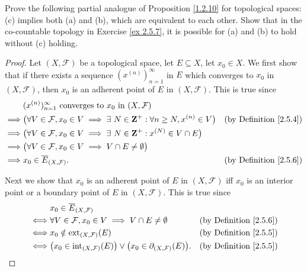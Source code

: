 \begin{exercise}\label{ex 2.5.10}
    Prove the following partial analogue of Proposition \ref{1.2.10} for topological spaces:
    (c) implies both (a) and (b), which are equivalent to each other.
    Show that in the co-countable topology in Exercise \ref{ex 2.5.7}, it is possible for (a) and (b) to hold without (c) holding.
\end{exercise}

\begin{proof}
    Let \((X, \mathcal{F})\) be a topological space, let \(E \subseteq X\), let \(x_0 \in X\).
    We first show that if there exists a sequence \((x^{(n)})_{n = 1}^\infty\) in \(E\) which converges to \(x_0\) in \((X, \mathcal{F})\), then \(x_0\) is an adherent point of \(E\) in \((X, \mathcal{F})\).
    This is true since
    \begin{align*}
                 & (x^{(n)})_{n = 1}^\infty \text{ converges to } x_0 \text{ in } (X, \mathcal{F})                                                                            \\
        \implies & \big(\forall V \in \mathcal{F}, x_0 \in V \implies \exists\ N \in \mathbf{Z}^+ : \forall n \geq N, x^{(n)} \in V\big) & \text{(by Definition \ref{2.5.4})} \\
        \implies & \big(\forall V \in \mathcal{F}, x_0 \in V \implies \exists\ N \in \mathbf{Z}^+ : x^{(N)} \in V \cap E\big)                                                 \\
        \implies & \big(\forall V \in \mathcal{F}, x_0 \in V \implies V \cap E \neq \emptyset\big)                                                                            \\
        \implies & x_0 \in \overline{E}_{(X, \mathcal{F})}.                                                                              & \text{(by Definition \ref{2.5.6})}
    \end{align*}

    Next we show that \(x_0\) is an adherent point of \(E\) in \((X, \mathcal{F})\) iff \(x_0\) is an interior point or a boundary point of \(E\) in \((X, \mathcal{F})\).
    This is true since
    \begin{align*}
             & x_0 \in \overline{E}_{(X, \mathcal{F})}                                                                                                        \\
        \iff & \forall V \in \mathcal{F}, x_0 \in V \implies V \cap E \neq \emptyset                                     & \text{(by Definition \ref{2.5.6})} \\
        \iff & x_0 \notin \text{ext}_{(X, \mathcal{F})}(E)                                                               & \text{(by Definition \ref{2.5.5})} \\
        \iff & \big(x_0 \in \text{int}_{(X, \mathcal{F})}(E)\big) \lor \big(x_0 \in \partial_{(X, \mathcal{F})}(E)\big). & \text{(by Definition \ref{2.5.5})}
    \end{align*}


\end{proof}
